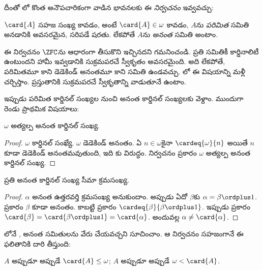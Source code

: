 \documentclass[../../../include/open-logic-section]{subfiles}
\begin{document}
దీంతో లో కొంత అనౌపచారికంగా వాడిన భావనలకు ఈ \emph{నిర్వచనం} ఇవ్వవచ్చు:

\begin{defn}
$\card{A}$ సహజ సంఖ్య కావడం, అంటే $\card{A} \in \omega$
కావడం, $A$ను \emph{పరిమిత} సమితి అనడానికి అవసరమైన, సరిపడే షరతు. లేకపోతే
$A$ను \emph{అనంత} సమితి అంటాం.
\end{defn}
\noindent
ఈ నిర్వచనం $\ZFC$ను ఆధారంగా తీసుకొని ఇచ్చినదని
గమనించండి. ప్రతి సమితికీ కార్డినాలిటీ ఉంటుందని హామీ
ఇవ్వడానికి సుక్రమపరచే స్వీకృతం అవసరమైంది. అది లేకపోతే,
పరిమితమూ కాని డెడెకిండ్ అనంతమూ కాని సమితి ఉండవచ్చు.
లో ఈ విషయాన్ని మళ్లీ చర్చిస్తాం.
ప్రస్తుతానికి సుక్రమపరచే స్వీకృతాన్ని వాడుతూనే ఉంటాం.

ఇప్పుడు పరిమిత కార్డినల్ సంఖ్యల నుంచి అనంత కార్డినల్ సంఖ్యలకు వెళ్దాం. ముందుగా రెండు ప్రాథమిక విషయాలు:

\begin{cor}
$\omega$ అత్యల్ప అనంత కార్డినల్ సంఖ్య.
\end{cor}

\begin{proof}
$\omega$ కార్డినల్ సంఖ్యే. $\omega$ డెడెకిండ్ అనంతం. ఏ $n \in \omega$కైనా $\cardeq{\omega}{n}$ అయితే $n$ కూడా డెడెకిండ్ అనంతమవుతుంది, ఇది కు విరుద్ధం. నిర్వచనం ప్రకారం $\omega$ అత్యల్ప అనంత కార్డినల్ సంఖ్య.
\end{proof}

\begin{cor}
ప్రతి అనంత కార్డినల్ సంఖ్య సీమా క్రమసంఖ్య.
\end{cor}

\begin{proof}
$\alpha$ అనంత ఉత్తరవర్తి క్రమసంఖ్య అనుకుందాం. అప్పుడు ఏదో $\beta$కు $\alpha = \beta
\ordplus 1$.  ప్రకారం $\beta$ కూడా అనంతం. కాబట్టి  ప్రకారం $\cardeq{\beta}{\beta \ordplus 1}$. ఇప్పుడు  ప్రకారం $\card{\beta} = \card{\beta\ordplus 1} = \card{\alpha}$. అందువల్ల $\alpha \neq \card{\alpha}$.
\end{proof}

లోనే ,  అనంత సమితులను వేరు చేయవచ్చని సూచించాం. ఆ నిర్వచనం సహజంగానే ఈ ఫలితానికి దారి తీస్తుంది:

\begin{prop}
$A$  అప్పుడూ అప్పుడే $\card{A} \leq \omega$; $A$  అప్పుడూ అప్పుడే $\omega < \card{A}$.
\end{prop}
\end{document}
